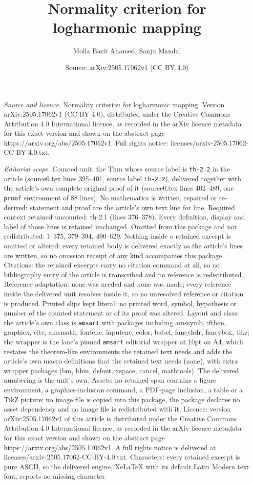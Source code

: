 \documentclass[10pt,a4paper]{amsart}
\title[Normality criterion for logharmonic mapping]{Normality criterion for logharmonic mapping}
\author{Molla Basir Ahamed, Sanju Mandal}
\date{Source: arXiv:2505.17062v1 (CC BY 4.0)}
\begin{document}
\maketitle

\noindent\emph{Source and licence.} Normality criterion for logharmonic mapping. Version arXiv:2505.17062v1 (CC BY 4.0), distributed under the Creative Commons Attribution 4.0 International licence, as recorded in the arXiv licence metadata for this exact version and shown on the abstract page https://arxiv.org/abs/2505.17062v1. Full rights notice: licenses/arxiv-2505.17062-CC-BY-4.0.txt.\par\smallskip

\noindent\textit{Editorial scope.} Counted unit: the Thm whose source label is \texttt{th-2.2} in the article (source0.tex lines 395--401, source label \texttt{th-2.2}), delivered together with the article's own complete original proof of it (source0.tex lines 402--489, one \texttt{proof} environment of 88 lines). No mathematics is written, repaired or re-derived: statement and proof are the article's own text line for line. Required context retained uncounted: th-2.1 (lines 376--378). Every definition, display and label of those lines is retained unchanged. Omitted from this package and not redistributed: 1--375, 379--394, 490--629. Nothing inside a retained excerpt is omitted or altered: every retained body is delivered exactly as the article's lines are written, so no omission receipt of any kind accompanies this package. Citations: the retained excerpts carry no citation command at all, so no bibliography entry of the article is transcribed and no reference is redistributed. Reference adaptation: none was needed and none was made; every reference inside the delivered unit resolves inside it, so no unresolved reference or citation is produced. Printed slips kept literal: no printed word, symbol, hypothesis or number of the counted statement or of its proof was altered. Layout and class: the article's own class is \texttt{amsart} with packages including amssymb, ifthen, graphicx, cite, amsmath, fontenc, inputenc, color, babel, fancyhdr, fancybox, tikz; the wrapper is the lane's pinned \texttt{amsart} editorial wrapper at 10pt on A4, which restates the theorem-like environments the retained text needs and adds the article's own macro definitions that the retained text needs (none), with extra wrapper packages (bm, bbm, dsfont, xspace, cancel, mathtools). The delivered numbering is the unit's own. Assets: no retained span contains a figure environment, a graphics-inclusion command, a PDF-page inclusion, a table or a TikZ picture; no image file is copied into this package, the package declares no asset dependency and no image file is redistributed with it. Licence: version arXiv:2505.17062v1 of this article is distributed under the Creative Commons Attribution 4.0 International licence, as recorded in the arXiv licence metadata for this exact version and shown on the abstract page https://arxiv.org/abs/2505.17062v1. A full rights notice is delivered at licenses/arxiv-2505.17062-CC-BY-4.0.txt. Characters: every retained excerpt is pure ASCII, so the delivered engine, XeLaTeX with its default Latin Modern text font, reports no missing character.
\end{document}
